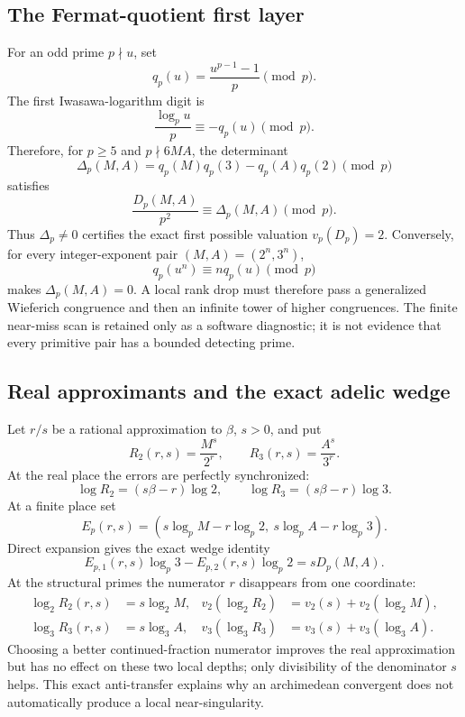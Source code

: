 \documentclass[11pt,oneside]{article}
\theoremstyle{definition}
\theoremstyle{remark}
\begin{document}
\subsection{The Fermat-quotient first layer}
\label{fp:fermat}

For an odd prime $p\nmid u$, set
\[
 q_p(u)=\frac{u^{p-1}-1}{p}\pmod p.
\]
The first Iwasawa-logarithm digit is
\begin{equation}
 \frac{\log_pu}{p}\equiv-q_p(u)\pmod p.
 \label{fp:eq-log-fermat}
\end{equation}
Therefore, for $p\ge5$ and $p\nmid6MA$, the determinant
\begin{equation}
 \Delta_p(M,A)=q_p(M)q_p(3)-q_p(A)q_p(2)\pmod p
 \label{fp:eq-fermat-determinant}
\end{equation}
satisfies
\begin{equation}
 \frac{D_p(M,A)}{p^2}\equiv\Delta_p(M,A)\pmod p.
 \label{fp:eq-local-first-layer}
\end{equation}
Thus $\Delta_p\ne0$ certifies the exact first possible valuation
$v_p(D_p)=2$.  Conversely, for every integer-exponent pair
$(M,A)=(2^n,3^n)$,
\[
 q_p(u^n)\equiv n q_p(u)\pmod p
\]
makes $\Delta_p(M,A)=0$.  A local rank drop must therefore pass a generalized Wieferich
congruence and then an infinite tower of higher congruences.  The finite near-miss scan is
retained only as a software diagnostic; it is not evidence that every primitive
pair has a bounded detecting prime.

\subsection{Real approximants and the exact adelic wedge}
\label{fp:adelic-wedge}

Let $r/s$ be a rational approximation to $\beta$, $s>0$, and put
\[
 R_2(r,s)=\frac{M^s}{2^r},\qquad
 R_3(r,s)=\frac{A^s}{3^r}.
\]
At the real place the errors are perfectly synchronized:
\[
 \log R_2=(s\beta-r)\log2,\qquad
 \log R_3=(s\beta-r)\log3.
\]
At a finite place set
\[
 E_p(r,s)=
 (s\log_pM-r\log_p2,\ s\log_pA-r\log_p3).
\]
Direct expansion gives the exact wedge identity
\begin{equation}
 E_{p,1}(r,s)\log_p3-E_{p,2}(r,s)\log_p2=sD_p(M,A).
 \label{fp:eq-adelic-wedge}
\end{equation}
At the structural primes the numerator $r$ disappears from one coordinate:
\begin{align}
 \log_2R_2(r,s)&=s\log_2M,&
 v_2(\log_2R_2)&=v_2(s)+v_2(\log_2M),\\
 \log_3R_3(r,s)&=s\log_3A,&
 v_3(\log_3R_3)&=v_3(s)+v_3(\log_3A).
 \label{fp:eq-structural-errors}
\end{align}
Choosing a better continued-fraction numerator improves the real approximation but has no
effect on these two local depths; only divisibility of the denominator $s$ helps.  This exact
anti-transfer explains why an archimedean convergent does not automatically produce a local
near-singularity.
\end{document}
